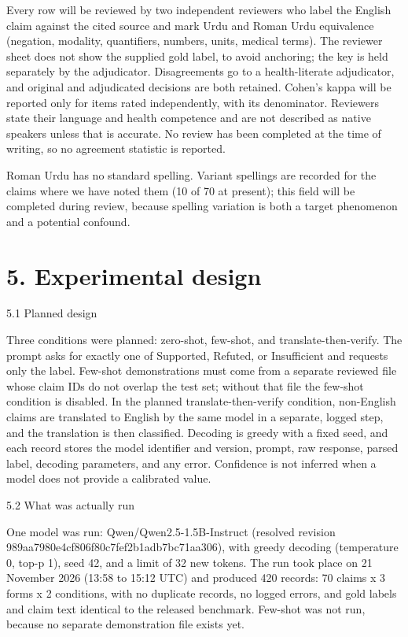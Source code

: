\documentclass[10pt,a4paper]{article}
\begin{document}
Every row will be reviewed by two independent reviewers who label the English claim against the cited source and mark Urdu and Roman Urdu equivalence (negation, modality, quantifiers, numbers, units, medical terms). The reviewer sheet does not show the supplied gold label, to avoid anchoring; the key is held separately by the adjudicator. Disagreements go to a health-literate adjudicator, and original and adjudicated decisions are both retained. Cohen's kappa will be reported only for items rated independently, with its denominator. Reviewers state their language and health competence and are not described as native speakers unless that is accurate. No review has been completed at the time of writing, so no agreement statistic is reported.

Roman Urdu has no standard spelling. Variant spellings are recorded for the claims where we have noted them (10 of 70 at present); this field will be completed during review, because spelling variation is both a target phenomenon and a potential confound.

\section{5. Experimental design}
5.1 Planned design

Three conditions were planned: zero-shot, few-shot, and translate-then-verify. The prompt asks for exactly one of Supported, Refuted, or Insufficient and requests only the label. Few-shot demonstrations must come from a separate reviewed file whose claim IDs do not overlap the test set; without that file the few-shot condition is disabled. In the planned translate-then-verify condition, non-English claims are translated to English by the same model in a separate, logged step, and the translation is then classified. Decoding is greedy with a fixed seed, and each record stores the model identifier and version, prompt, raw response, parsed label, decoding parameters, and any error. Confidence is not inferred when a model does not provide a calibrated value.

5.2 What was actually run

One model was run: Qwen/Qwen2.5-1.5B-Instruct (resolved revision 989aa7980e4cf806f80c7fef2b1adb7bc71aa306), with greedy decoding (temperature 0, top-p 1), seed 42, and a limit of 32 new tokens. The run took place on 21 November 2026 (13:58 to 15:12 UTC) and produced 420 records: 70 claims x 3 forms x 2 conditions, with no duplicate records, no logged errors, and gold labels and claim text identical to the released benchmark. Few-shot was not run, because no separate demonstration file exists yet.
\end{document}
